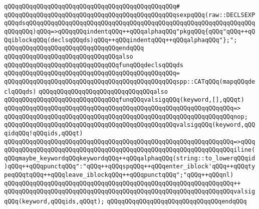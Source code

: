 \verb|qQQqqQQqqQQqqQQqqQQqqQQqqQQqqQQqqQQqqQQqqQQqqQQq#|\newline
\verb|qQQqqQQqqQQqqQQqqQQqqQQqqQQqqQQqqQQqqQQqqQQqqQQqsexpqQQq(raw::DECLSEXPqQQqdsqQQqqQQqqQQqqQQqqQQqqQQqqQQqqQQqqQQqqQQqqQQqqQQqqQQqqQQqqQQqqQQqqQQqqQQq)qQQq=>qQQqqQQqindentqQQq++qQQqalphaqQQq"pkgqQQq{qQQq"qQQq++qQQqiblockqQQq(declsqQQqds)qQQq++qQQqindentqQQq++qQQqalphaqQQq"};";|\newline
\verb|qQQqqQQqqQQqqQQqqQQqqQQqqQQqqQQqendqQQq|\newline
\newline
\verb|qQQqqQQqqQQqqQQqqQQqqQQqqQQqqQQqalso|\newline
\verb|qQQqqQQqqQQqqQQqqQQqqQQqqQQqqQQqfunqQQqdeclsqQQqds|\newline
\verb|qQQqqQQqqQQqqQQqqQQqqQQqqQQqqQQqqQQqqQQqqQQqqQQq=|\newline
\verb|qQQqqQQqqQQqqQQqqQQqqQQqqQQqqQQqqQQqqQQqqQQqqQQqspp::CATqQQq(mapqQQqdeclqQQqds)|\newline
\newline
\verb|qQQqqQQqqQQqqQQqqQQqqQQqqQQqqQQqalso|\newline
\verb|qQQqqQQqqQQqqQQqqQQqqQQqqQQqqQQqfunqQQqvalsigqQQq(keyword,[],qQQqt)|\newline
\verb|qQQqqQQqqQQqqQQqqQQqqQQqqQQqqQQqqQQqqQQqqQQqqQQqqQQqqQQqqQQqqQQq=>|\newline
\verb|qQQqqQQqqQQqqQQqqQQqqQQqqQQqqQQqqQQqqQQqqQQqqQQqqQQqqQQqqQQqqQQqnop;|\newline
\newline
\verb|qQQqqQQqqQQqqQQqqQQqqQQqqQQqqQQqqQQqqQQqqQQqqQQqvalsigqQQq(keyword,qQQqidqQQq!qQQqids,qQQqt)|\newline
\verb|qQQqqQQqqQQqqQQqqQQqqQQqqQQqqQQqqQQqqQQqqQQqqQQqqQQqqQQqqQQqqQQq=>qQQq|\newline
\verb|qQQqqQQqqQQqqQQqqQQqqQQqqQQqqQQqqQQqqQQqqQQqqQQqqQQqqQQqqQQqqQQqiline(qQQqmaybe_keywordqQQqkeywordqQQq++qQQqalphaqQQq(string::to_lowerqQQqid)qQQq++qQQqpunctqQQq":"qQQq++qQQqspqQQq++qQQqenter_iblock'qQQq++qQQqtypeqQQqtqQQq++qQQqleave_iblockqQQq++qQQqpunctqQQq";"qQQq++qQQqnl)|\newline
\verb|qQQqqQQqqQQqqQQqqQQqqQQqqQQqqQQqqQQqqQQqqQQqqQQqqQQqqQQqqQQqqQQq++|\newline
\verb|qQQqqQQqqQQqqQQqqQQqqQQqqQQqqQQqqQQqqQQqqQQqqQQqqQQqqQQqqQQqqQQqvalsigqQQq(keyword,qQQqids,qQQqt);|\newline
\verb|qQQqqQQqqQQqqQQqqQQqqQQqqQQqqQQqendqQQq|\newline
\newline
